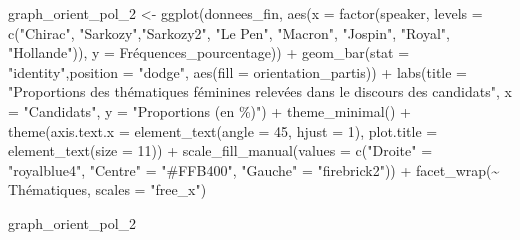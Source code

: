 \documentclass[
  letterpaper,
  DIV=11,
  numbers=noendperiod]{scrartcl}
\newenvironment{Shaded}{\begin{snugshade}}{\end{snugshade}}
\newcommand{\AttributeTok}[1]{\textcolor[rgb]{0.40,0.45,0.13}{#1}}
\newcommand{\DecValTok}[1]{\textcolor[rgb]{0.68,0.00,0.00}{#1}}
\newcommand{\FunctionTok}[1]{\textcolor[rgb]{0.28,0.35,0.67}{#1}}
\newcommand{\NormalTok}[1]{\textcolor[rgb]{0.00,0.23,0.31}{#1}}
\newcommand{\OtherTok}[1]{\textcolor[rgb]{0.00,0.23,0.31}{#1}}
\newcommand{\SpecialCharTok}[1]{\textcolor[rgb]{0.37,0.37,0.37}{#1}}
\newcommand{\StringTok}[1]{\textcolor[rgb]{0.13,0.47,0.30}{#1}}
\begin{document}
\begin{Shaded}
\begin{Highlighting}[]
\NormalTok{graph\_orient\_pol\_2 }\OtherTok{\textless{}{-}} \FunctionTok{ggplot}\NormalTok{(donnees\_fin, }\FunctionTok{aes}\NormalTok{(}\AttributeTok{x =} \FunctionTok{factor}\NormalTok{(speaker, }\AttributeTok{levels =} \FunctionTok{c}\NormalTok{(}\StringTok{"Chirac"}\NormalTok{, }\StringTok{"Sarkozy"}\NormalTok{,}\StringTok{"Sarkozy2"}\NormalTok{, }\StringTok{"Le Pen"}\NormalTok{, }\StringTok{"Macron"}\NormalTok{, }\StringTok{"Jospin"}\NormalTok{, }\StringTok{"Royal"}\NormalTok{, }\StringTok{"Hollande"}\NormalTok{)), }\AttributeTok{y =}\NormalTok{ Fréquences\_pourcentage)) }\SpecialCharTok{+} \FunctionTok{geom\_bar}\NormalTok{(}\AttributeTok{stat =} \StringTok{"identity"}\NormalTok{,}\AttributeTok{position =} \StringTok{"dodge"}\NormalTok{, }\FunctionTok{aes}\NormalTok{(}\AttributeTok{fill =}\NormalTok{ orientation\_partis)) }\SpecialCharTok{+} \FunctionTok{labs}\NormalTok{(}\AttributeTok{title =} \StringTok{"Proportions des thématiques féminines relevées dans le discours des candidats"}\NormalTok{, }\AttributeTok{x =} \StringTok{"Candidats"}\NormalTok{, }\AttributeTok{y =} \StringTok{"Proportions (en \%)"}\NormalTok{) }\SpecialCharTok{+} \FunctionTok{theme\_minimal}\NormalTok{() }\SpecialCharTok{+} \FunctionTok{theme}\NormalTok{(}\AttributeTok{axis.text.x =} \FunctionTok{element\_text}\NormalTok{(}\AttributeTok{angle =} \DecValTok{45}\NormalTok{, }\AttributeTok{hjust =} \DecValTok{1}\NormalTok{), }\AttributeTok{plot.title =} \FunctionTok{element\_text}\NormalTok{(}\AttributeTok{size =} \DecValTok{11}\NormalTok{)) }\SpecialCharTok{+} \FunctionTok{scale\_fill\_manual}\NormalTok{(}\AttributeTok{values =} \FunctionTok{c}\NormalTok{(}\StringTok{"Droite"} \OtherTok{=} \StringTok{"royalblue4"}\NormalTok{, }\StringTok{"Centre"} \OtherTok{=} \StringTok{"\#FFB400"}\NormalTok{, }\StringTok{"Gauche"} \OtherTok{=} \StringTok{"firebrick2"}\NormalTok{)) }\SpecialCharTok{+} \FunctionTok{facet\_wrap}\NormalTok{(}\SpecialCharTok{\textasciitilde{}}\NormalTok{ Thématiques, }\AttributeTok{scales =} \StringTok{"free\_x"}\NormalTok{)}

\NormalTok{graph\_orient\_pol\_2}
\end{Highlighting}
\end{Shaded}
\end{document}
